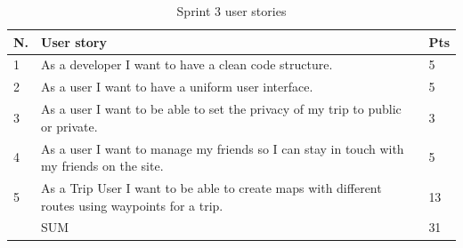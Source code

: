\documentclass[a4paper]{article}
\begin{document}
\begin{table}[H]
  \centering
  \begin{tabulary}{1.0\linewidth}{|L|L|L|}
    \hline
    N. & User story & Pts \\ & As a developer I want to have a clean code structure.
    & 5 \\ \hline

    2& As a user I want to have a uniform user interface.
    & 5 \\ \hline

    3& As a user I want to be able to set the privacy of my trip to public or private.
    & 3 \\ \hline

    4&As a user I want to manage my friends so I can stay in touch with my friends on the site.
    & 5 \\ \hline

    5& As a Trip User I want to be able to create maps with different routes using waypoints for a trip.
    & 13 \\ \hline

    & SUM & 31 \\ \hline
  \end{tabulary}
  \caption{Sprint 3 user stories}
\label{tab:sprint3}
\end{table}
\end{document}

